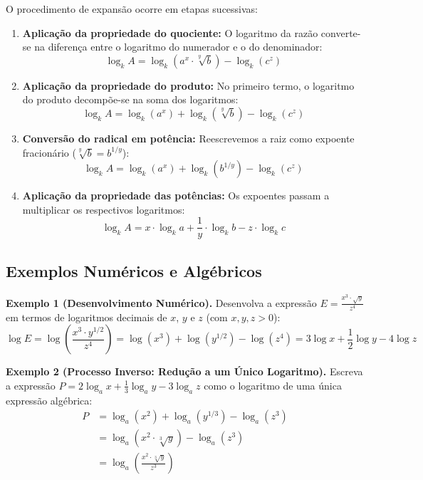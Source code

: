 \documentclass[12pt,a4paper]{report}
\begin{document}
	O procedimento de expansão ocorre em etapas sucessivas:
	
	\begin{destaque}
		\begin{enumerate}[label=\textbf{\arabic*.}]
			\item \textbf{Aplicação da propriedade do quociente:}  
			O logaritmo da razão converte-se na diferença entre o logaritmo do numerador e o do denominador:
			$$\log_k A = \log_k \left( a^x \cdot \sqrt[y]{b} \right) - \log_k (c^z)$$
			
			\item \textbf{Aplicação da propriedade do produto:}  
			No primeiro termo, o logaritmo do produto decompõe-se na soma dos logaritmos:
			$$\log_k A = \log_k (a^x) + \log_k (\sqrt[y]{b}) - \log_k (c^z)$$
			
			\item \textbf{Conversão do radical em potência:}  
			Reescrevemos a raiz como expoente fracionário ($\sqrt[y]{b} = b^{1/y}$):
			$$\log_k A = \log_k (a^x) + \log_k \left( b^{1/y} \right) - \log_k (c^z)$$
			
			\item \textbf{Aplicação da propriedade das potências:}  
			Os expoentes passam a multiplicar os respectivos logaritmos:
			$$\log_k A = x \cdot \log_k a + \frac{1}{y} \cdot \log_k b - z \cdot \log_k c$$
		\end{enumerate}
	\end{destaque}
	
	\subsection*{Exemplos Numéricos e Algébricos}
	
	\textbf{Exemplo 1 (Desenvolvimento Numérico).} Desenvolva a expressão $E = \frac{x^3 \cdot \sqrt{y}}{z^4}$ em termos de logaritmos decimais de $x$, $y$ e $z$ (com $x, y, z > 0$):
	$$\log E = \log\left(\frac{x^3 \cdot y^{1/2}}{z^4}\right) = \log(x^3) + \log\left(y^{1/2}\right) - \log(z^4) = 3\log x + \frac{1}{2}\log y - 4\log z$$
	
	\vspace{0.3cm}
	
	\vspace{0.3cm}
	
	\textbf{Exemplo 2 (Processo Inverso: Redução a um Único Logaritmo).}  
	Escreva a expressão $P = 2\log_a x + \frac{1}{3}\log_a y - 3\log_a z$ como o logaritmo de uma única expressão algébrica:
	\begin{align*}
		P &= \log_a (x^2) + \log_a \left(y^{1/3}\right) - \log_a (z^3) \\
		&= \log_a \left(x^2 \cdot \sqrt[3]{y}\right) - \log_a (z^3) \\
		&= \log_a \left(\frac{x^2 \cdot \sqrt[3]{y}}{z^3}\right)
	\end{align*}
	
\end{document}
